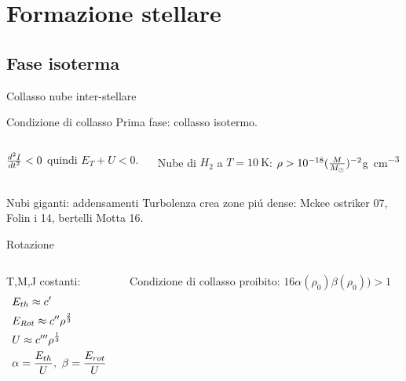 \section{Formazione stellare}

\subsection{Fase isoterma}

\begin{frame}{Collasso nube inter-stellare}
\begin{block}{Condizione di collasso}
Prima fase: collasso isotermo.
\begin{columns}
\begin{column}{0.5\textwidth}
$\TtwoDy{t}{I}<0$ quindi $E_T+U<0$.
\end{column}
\begin{column}{0.5\textwidth}
Nube di $H_2$ a $T=\SI{10}{\kelvin}$:
$\rho>\num{e-18}(\frac{M}{\msun{}})^{-2}$\si{\gram\per\cubic\cm}
\end{column}
\end{columns}
\begin{block}{Nubi giganti: addensamenti}
Turbolenza crea zone pi\'u dense: Mckee ostriker 07, Folin i 14, bertelli Motta 16.
\end{block}
\begin{block}{Rotazione}
\begin{columns}[T]
\begin{column}{0.5\textwidth}
T,M,J costanti:
\begin{align*}
&E_{th}\approx c'\\
&E_{Rot}\approx c''\rho\expy{\frac{2}{3}}\\
&U\approx c'''\rho\expy{\frac{1}{3}}\\
&\alpha=\frac{E_{th}}{U},\ \beta=\frac{E_{rot}}{U}
\end{align*}
\end{column}
\begin{column}{0.5\textwidth}
Condizione di collasso proibito: $16\alpha(\rho_0)\beta(\rho_0))>1$
\end{column}
\end{columns}
\end{block}
\end{block}
\end{frame}

